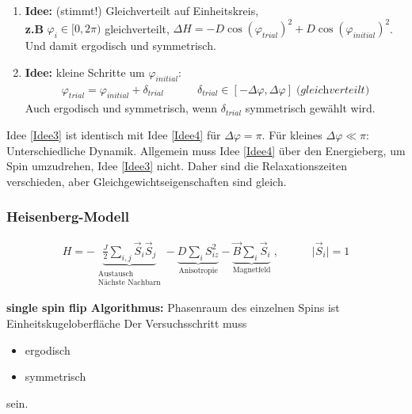 \documentclass[12pt]{article}
\begin{document}
\begin{enumerate}
\item \textbf{Idee:}\label{Idee3} (stimmt!) Gleichverteilt auf Einheitskreis,\\ \textbf{z.B} $\varphi_i \in [0, 2\pi)$ gleichverteilt, $\Delta H = -D \cos (\varphi_{trial})^2 + D \cos (\varphi_{initial})^2$. \\
Und damit ergodisch und symmetrisch.

\item \textbf{Idee:}\label{Idee4} kleine Schritte um $\varphi_{initial}$: 
\begin{align*}
\varphi_{trial} = \varphi_{initial} + \delta_{trial} \quad \quad \quad \delta_{trial} \in [ - \Delta \varphi, \Delta \varphi ] \; \textit{(gleichverteilt)}
\end{align*}
Auch ergodisch und symmetrisch, wenn $\delta_{trial}$ symmetrisch gewählt wird.
\end{enumerate}

Idee \ref{Idee3} ist identisch mit Idee \ref{Idee4} für $\Delta \varphi = \pi$. Für kleines $\Delta \varphi \ll \pi$: Unterschiedliche Dynamik. Allgemein muss Idee \ref{Idee4} über den Energieberg, um Spin umzudrehen, Idee \ref{Idee3} nicht. Daher sind die Relaxationszeiten verschieden, aber Gleichgewichtseigenschaften sind gleich. 





\subsubsection{Heisenberg-Modell}
\begin{align}
H= - \underbrace{\frac{J}{2} \sum_{i,j} \vec{S}_i \vec{S}_j}_{\substack{\text{Austausch} \\ \text{Nächste Nachbarn}}}
 - \underbrace{ D \sum_i S_{iz}^2}_\text{Anisotropie} - \underbrace{\vec{B} \sum_i \vec{S}_i}_\text{Magnetfeld} \; , \quad \quad \quad \vert \vec{S}_i \vert =1
\end{align}

\textbf{single spin flip Algorithmus:} Phasenraum des einzelnen Spins ist Einheitskugeloberfläche 
Der Versuchsschritt muss
\begin{itemize}
\item ergodisch
\item symmetrisch
\end{itemize} %
sein. 
\end{document}
